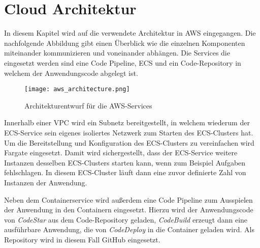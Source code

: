 \section{Cloud Architektur}
In diesem Kapitel wird auf die verwendete Architektur in \ac{AWS} eingegangen. Die nachfolgende Abbildung gibt einen Überblick wie die einzelnen Komponenten miteinander kommunizieren und voneinander abhängen. Die Services die eingesetzt werden sind eine Code Pipeline, \ac{ECS} und ein Code-\gls{Repository} in welchem der Anwendungscode abgelegt ist.

\begin{figure}[H]
    \centering
    \texttt{[image: aws\_architecture.png]}
    \caption{Architekturentwurf für die AWS-Services}
    \label{fig:CloudArchitektur}
\end{figure}

Innerhalb einer \ac{VPC} wird ein Subnetz bereitgestellt, in welchem wiederum der \ac{ECS}-Service sein eigenes isoliertes Netzwerk zum Starten des \ac{ECS}-Clusters hat. Um die Bereitstellung und Konfiguration des \ac{ECS}-Clusters zu vereinfachen wird Fargate eingesetzt. Damit wird sichergestellt, dass der \ac{ECS}-Service weitere Instanzen desselben \ac{ECS}-Clusters starten kann, wenn zum Beispiel Aufgaben fehlschlagen. In diesem \ac{ECS}-Cluster läuft dann eine zuvor definierte Zahl von Instanzen der Anwendung.

Neben dem Containerservice wird außerdem eine Code Pipeline zum Ausspielen der Anwendung in den Containern eingesetzt. Hierzu wird der Anwendungscode von \textit{CodeStar} aus dem Code-\gls{Repository} geladen, \textit{CodeBuild} erzeugt dann eine ausführbare Anwendung, die von \textit{CodeDeploy} in die Container geladen wird. Als \gls{Repository} wird in diesem Fall \gls{GitHub} eingesetzt.